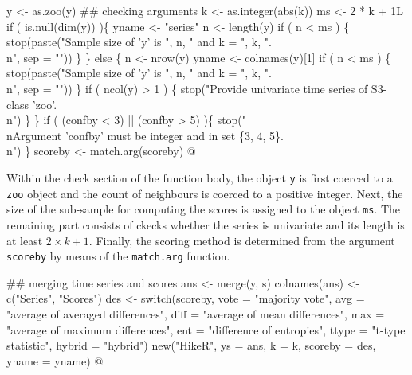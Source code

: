 \documentclass[a4paper]{article}
\begin{document}
\nwenddocs{}\endmoddef
    y <- as.zoo(y)
    ## checking arguments
    k <- as.integer(abs(k))
    ms <- 2 * k + 1L
    if ( is.null(dim(y)) )\{
        yname <- "series"
        n <- length(y)
        if ( n < ms ) \{
            stop(paste("Sample size of 'y' is ", n,
                       " and k = ", k, ".\\n", sep = ""))
            \}
    \} else \{
        n <- nrow(y)
        yname <- colnames(y)[1]
        if ( n < ms ) \{
            stop(paste("Sample size of 'y' is ", n,
                       " and k = ", k, ".\\n", sep = ""))
        \}
        if ( ncol(y) > 1 ) \{
            stop("Provide univariate time series of S3-class 'zoo'.\\n")
        \}
    \}
    if ( (confby < 3) || (confby > 5) )\{
        stop("\\nArgument 'confby' must be integer and in set \{3, 4, 5\}.\\n")
    \}
    scoreby <- match.arg(scoreby)
\nwendcode{}@

Within the check section of the function body, the object \verb?y? is
first coerced to a \verb?zoo? object and the count of neighbours is
coerced to a positive integer. Next, the size of the sub-sample for
computing the scores is assigned to the object \verb?ms?. The remaining
part consists of ckecks whether the series is univariate and its
length is at least $2 \times k + 1$. Finally, the scoring method is
determined from the argument \verb?scoreby? by means of the \verb?match.arg?
function.\par

\nwenddocs{}\endmoddef
    ## merging time series and scores
    ans <- merge(y, s)
    colnames(ans) <- c("Series", "Scores")
    des <- switch(scoreby,
                  vote = "majority vote",
                  avg = "average of averaged differences",
                  diff = "average of mean differences",
                  max = "average of maximum differences",
                  ent = "difference of entropies",
                  ttype = "t-type statistic",
                  hybrid = "hybrid")
    new("HikeR", ys = ans, k = k, scoreby = des, yname = yname)
\nwendcode{}@
\end{document}
